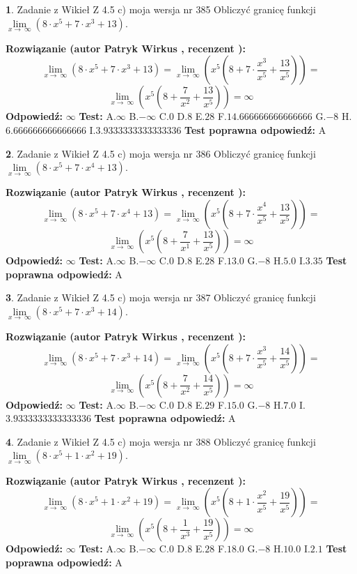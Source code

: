 \documentclass[12pt, a4paper]{article}
\theoremstyle{definition} %
\newtheorem{zad}{}
\newcommand{\zadStart}[1]{\begin{zad}#1\newline}
\newcommand{\zadStop}{\end{zad}}
\newcommand{\rozwStart}[2]{\noindent \textbf{Rozwiązanie (autor #1 , recenzent #2): }\newline}
\newcommand{\rozwStop}{\newline}
\newcommand{\odpStart}{\noindent \textbf{Odpowiedź:}\newline}
\newcommand{\odpStop}{\newline}
\newcommand{\testStart}{\noindent \textbf{Test:}\newline}
\newcommand{\testStop}{\newline}
\newcommand{\kluczStart}{\noindent \textbf{Test poprawna odpowiedź:}\newline}
\newcommand{\kluczStop}{\newline}
\begin{document}
\zadStart{Zadanie z Wikieł Z 4.5 c) moja wersja nr 385}
Obliczyć granicę funkcji  $\lim\limits_{x\to\ \infty}(8 \cdot x^{5}+7 \cdot x^{3}+13)$.
\zadStop
\rozwStart{Patryk Wirkus}{}
$$\lim\limits_{x\to\ \infty}(8 \cdot x^{5}+7 \cdot x^{3}+13) = \lim\limits_{x\to\ \infty}(x^{5}(8 +7 \cdot \frac{x^{3}}{x^{5}}+\frac{13}{x^{5}})) =$$ $$\lim\limits_{x\to\ \infty}(x^{5}(8 +\frac{7}{x^{2}}+\frac{13}{x^{5}})) =\infty$$
\rozwStop
\odpStart
$\infty$
\odpStop
\testStart
A.$\infty$ B.$-\infty$ C.$0$ D.$8$ E.$28$
F.$14.666666666666666$ G.$-8$
H.$6.666666666666666$
I.$3.9333333333333336$
\testStop
\kluczStart
A
\kluczStop



\zadStart{Zadanie z Wikieł Z 4.5 c) moja wersja nr 386}
Obliczyć granicę funkcji  $\lim\limits_{x\to\ \infty}(8 \cdot x^{5}+7 \cdot x^{4}+13)$.
\zadStop
\rozwStart{Patryk Wirkus}{}
$$\lim\limits_{x\to\ \infty}(8 \cdot x^{5}+7 \cdot x^{4}+13) = \lim\limits_{x\to\ \infty}(x^{5}(8 +7 \cdot \frac{x^{4}}{x^{5}}+\frac{13}{x^{5}})) =$$ $$\lim\limits_{x\to\ \infty}(x^{5}(8 +\frac{7}{x^{1}}+\frac{13}{x^{5}})) =\infty$$
\rozwStop
\odpStart
$\infty$
\odpStop
\testStart
A.$\infty$ B.$-\infty$ C.$0$ D.$8$ E.$28$
F.$13.0$ G.$-8$
H.$5.0$
I.$3.35$
\testStop
\kluczStart
A
\kluczStop



\zadStart{Zadanie z Wikieł Z 4.5 c) moja wersja nr 387}
Obliczyć granicę funkcji  $\lim\limits_{x\to\ \infty}(8 \cdot x^{5}+7 \cdot x^{3}+14)$.
\zadStop
\rozwStart{Patryk Wirkus}{}
$$\lim\limits_{x\to\ \infty}(8 \cdot x^{5}+7 \cdot x^{3}+14) = \lim\limits_{x\to\ \infty}(x^{5}(8 +7 \cdot \frac{x^{3}}{x^{5}}+\frac{14}{x^{5}})) =$$ $$\lim\limits_{x\to\ \infty}(x^{5}(8 +\frac{7}{x^{2}}+\frac{14}{x^{5}})) =\infty$$
\rozwStop
\odpStart
$\infty$
\odpStop
\testStart
A.$\infty$ B.$-\infty$ C.$0$ D.$8$ E.$29$
F.$15.0$ G.$-8$
H.$7.0$
I.$3.9333333333333336$
\testStop
\kluczStart
A
\kluczStop



\zadStart{Zadanie z Wikieł Z 4.5 c) moja wersja nr 388}
Obliczyć granicę funkcji  $\lim\limits_{x\to\ \infty}(8 \cdot x^{5}+1 \cdot x^{2}+19)$.
\zadStop
\rozwStart{Patryk Wirkus}{}
$$\lim\limits_{x\to\ \infty}(8 \cdot x^{5}+1 \cdot x^{2}+19) = \lim\limits_{x\to\ \infty}(x^{5}(8 +1 \cdot \frac{x^{2}}{x^{5}}+\frac{19}{x^{5}})) =$$ $$\lim\limits_{x\to\ \infty}(x^{5}(8 +\frac{1}{x^{3}}+\frac{19}{x^{5}})) =\infty$$
\rozwStop
\odpStart
$\infty$
\odpStop
\testStart
A.$\infty$ B.$-\infty$ C.$0$ D.$8$ E.$28$
F.$18.0$ G.$-8$
H.$10.0$
I.$2.1$
\testStop
\kluczStart
A
\kluczStop
\end{document}

